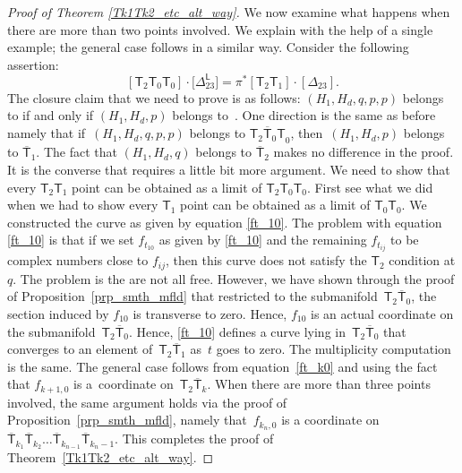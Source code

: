 \begin{proof}[Proof of Theorem \ref{Tk1Tk2_etc_alt_way}]
We now examine what happens when there are more than two points involved.
We explain with the help of a single example; the general case follows in a similar way.
Consider the following assertion:
\[
[\mathsf{T}_2 \mathsf{T}_0 \mathsf{T}_0] \cdot \bigl[\Delta^{\mathsf{L}}_{23}\bigr]  =
\pi^*[\mathsf{T}_2\mathsf{T}_1]\cdot [\Delta_{23}].
\]
The closure claim that we need to prove is as follows:
$(H_1, H_d, q, p, p)$ belongs to 
if and only if $(H_1, H_d, p)$ belongs to~.
One direction is the same as before namely that if~${(H_1, H_d, q, p, p)}$ belongs to
$\overline{\mathsf{T}_2\mathsf{T}_0 \mathsf{T}}_0$, then~$(H_1, H_d, p)$ belongs to $\overline{\mathsf{T}}_{1}$. The fact that
$(H_1, H_d, q)$ belongs to $\overline{\mathsf{T}}_2$ makes no difference in the proof.
It is the converse that requires a little bit more argument. We need to show that
every $\mathsf{T}_2 \mathsf{T}_1$ point can be obtained as a limit of
$\mathsf{T}_2 \mathsf{T}_0 \mathsf{T}_0$. First see what we did when we
had to show every $\mathsf{T}_1$ point can be obtained as a limit of
$\mathsf{T}_0 \mathsf{T}_0$. We constructed the curve as given by equation
\eqref{ft_10}. The problem with equation \eqref{ft_10} is that if we set
$f_{t_{10}}$ as given by \eqref{ft_10} and the remaining $f_{t_{ij}}$ to be
complex numbers close to $f_{ij}$, then this curve does not satisfy the
$\mathsf{T}_2$ condition at $q$. The problem is the  are not all free.
However, we have shown through the proof of Proposition~\ref{prp_smth_mfld} that
restricted to the submanifold~$\mathsf{T}_2 \overline{\mathsf{T}}_0$, the section induced by $f_{10}$ is transverse to
zero. Hence, $f_{10}$ is an actual coordinate on the submanifold~$\mathsf{T}_2 \overline{\mathsf{T}}_0$.
Hence, \eqref{ft_10} defines a curve lying in~$\mathsf{T}_2 \overline{\mathsf{T}}_0$ that
converges to an element of~$\mathsf{T}_2 \overline{\mathsf{T}}_1$ as~$t$ goes to zero.
The multiplicity computation is the same. The general case follows from equation~\eqref{ft_k0} and using the fact that $f_{k+1, 0}$ is a~coordinate on~$\mathsf{T}_2 \overline{\mathsf{T}}_{k}$. When there are more than three points involved, the
same argument holds via the proof of Proposition~\ref{prp_smth_mfld},
namely that~$f_{k_n, 0}$ is a coordinate on
$\overline{\mathsf{T}}_{k_1} \overline{\mathsf{T}}_{k_2}
\dots \overline{\mathsf{T}}_{k_{n-1}}\overline{\mathsf{T}}_{k_{n}-1}$.
This completes the proof of Theorem~\ref{Tk1Tk2_etc_alt_way}.
 \end{proof}
